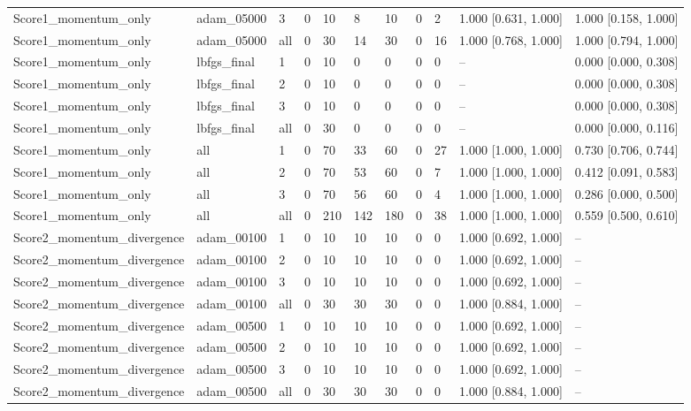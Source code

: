 \begin{longtable}{lllllllllll}
Score1\_momentum\_only & adam\_05000 & 3 & 0 & 10 & 8 & 10 & 0 & 2 & 1.000 [0.631, 1.000] & 1.000 [0.158, 1.000] \\
Score1\_momentum\_only & adam\_05000 & all & 0 & 30 & 14 & 30 & 0 & 16 & 1.000 [0.768, 1.000] & 1.000 [0.794, 1.000] \\
Score1\_momentum\_only & lbfgs\_final & 1 & 0 & 10 & 0 & 0 & 0 & 0 & -- & 0.000 [0.000, 0.308] \\
Score1\_momentum\_only & lbfgs\_final & 2 & 0 & 10 & 0 & 0 & 0 & 0 & -- & 0.000 [0.000, 0.308] \\
Score1\_momentum\_only & lbfgs\_final & 3 & 0 & 10 & 0 & 0 & 0 & 0 & -- & 0.000 [0.000, 0.308] \\
Score1\_momentum\_only & lbfgs\_final & all & 0 & 30 & 0 & 0 & 0 & 0 & -- & 0.000 [0.000, 0.116] \\
Score1\_momentum\_only & all & 1 & 0 & 70 & 33 & 60 & 0 & 27 & 1.000 [1.000, 1.000] & 0.730 [0.706, 0.744] \\
Score1\_momentum\_only & all & 2 & 0 & 70 & 53 & 60 & 0 & 7 & 1.000 [1.000, 1.000] & 0.412 [0.091, 0.583] \\
Score1\_momentum\_only & all & 3 & 0 & 70 & 56 & 60 & 0 & 4 & 1.000 [1.000, 1.000] & 0.286 [0.000, 0.500] \\
Score1\_momentum\_only & all & all & 0 & 210 & 142 & 180 & 0 & 38 & 1.000 [1.000, 1.000] & 0.559 [0.500, 0.610] \\
Score2\_momentum\_divergence & adam\_00100 & 1 & 0 & 10 & 10 & 10 & 0 & 0 & 1.000 [0.692, 1.000] & -- \\
Score2\_momentum\_divergence & adam\_00100 & 2 & 0 & 10 & 10 & 10 & 0 & 0 & 1.000 [0.692, 1.000] & -- \\
Score2\_momentum\_divergence & adam\_00100 & 3 & 0 & 10 & 10 & 10 & 0 & 0 & 1.000 [0.692, 1.000] & -- \\
Score2\_momentum\_divergence & adam\_00100 & all & 0 & 30 & 30 & 30 & 0 & 0 & 1.000 [0.884, 1.000] & -- \\
Score2\_momentum\_divergence & adam\_00500 & 1 & 0 & 10 & 10 & 10 & 0 & 0 & 1.000 [0.692, 1.000] & -- \\
Score2\_momentum\_divergence & adam\_00500 & 2 & 0 & 10 & 10 & 10 & 0 & 0 & 1.000 [0.692, 1.000] & -- \\
Score2\_momentum\_divergence & adam\_00500 & 3 & 0 & 10 & 10 & 10 & 0 & 0 & 1.000 [0.692, 1.000] & -- \\
Score2\_momentum\_divergence & adam\_00500 & all & 0 & 30 & 30 & 30 & 0 & 0 & 1.000 [0.884, 1.000] & -- \\

\end{longtable}
